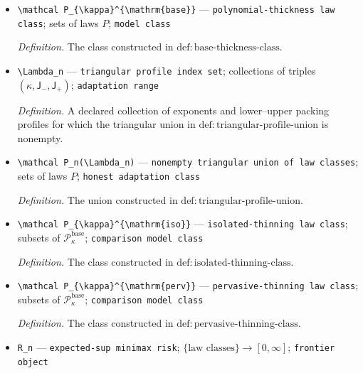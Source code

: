 \documentclass{article}
\begin{document}
\begin{itemize}
  \item \texttt{\textbackslash{}\allowbreak{}mathcal P\_\allowbreak{}\{\textbackslash{}\allowbreak{}kappa\}\allowbreak{}\textasciicircum{}\{\textbackslash{}\allowbreak{}mathrm\{base\}\allowbreak{}\}\allowbreak{}} --- \texttt{polynomial-\allowbreak{}thickness law class}; sets of laws \(P\); \texttt{model class}
  \par\smallskip\noindent\emph{Definition.} The class constructed in \(\mathrm{def:base\text{-}thickness\text{-}class}\).
  \item \texttt{\textbackslash{}\allowbreak{}Lambda\_\allowbreak{}n} --- \texttt{triangular profile index set}; collections of triples \( (\kappa,\mathsf J_{-},\mathsf J_{+})\); \texttt{adaptation range}
  \par\smallskip\noindent\emph{Definition.} A declared collection of exponents and lower--upper packing profiles for which the triangular union in \(\mathrm{def:triangular\text{-}profile\text{-}union}\) is nonempty.
  \item \texttt{\textbackslash{}\allowbreak{}mathcal P\_\allowbreak{}n(\textbackslash{}\allowbreak{}Lambda\_\allowbreak{}n)} --- \texttt{nonempty triangular union of law classes}; sets of laws \(P\); \texttt{honest adaptation class}
  \par\smallskip\noindent\emph{Definition.} The union constructed in \(\mathrm{def:triangular\text{-}profile\text{-}union}\).
  \item \texttt{\textbackslash{}\allowbreak{}mathcal P\_\allowbreak{}\{\textbackslash{}\allowbreak{}kappa\}\allowbreak{}\textasciicircum{}\{\textbackslash{}\allowbreak{}mathrm\{iso\}\allowbreak{}\}\allowbreak{}} --- \texttt{isolated-\allowbreak{}thinning law class}; subsets of \(\mathcal P_{\kappa}^{\mathrm{base}}\); \texttt{comparison model class}
  \par\smallskip\noindent\emph{Definition.} The class constructed in \(\mathrm{def:isolated\text{-}thinning\text{-}class}\).
  \item \texttt{\textbackslash{}\allowbreak{}mathcal P\_\allowbreak{}\{\textbackslash{}\allowbreak{}kappa\}\allowbreak{}\textasciicircum{}\{\textbackslash{}\allowbreak{}mathrm\{perv\}\allowbreak{}\}\allowbreak{}} --- \texttt{pervasive-\allowbreak{}thinning law class}; subsets of \(\mathcal P_{\kappa}^{\mathrm{base}}\); \texttt{comparison model class}
  \par\smallskip\noindent\emph{Definition.} The class constructed in \(\mathrm{def:pervasive\text{-}thinning\text{-}class}\).
  \item \texttt{R\_\allowbreak{}n} --- \texttt{expected-\allowbreak{}sup minimax risk}; \(\{\text{law classes}\}\to[0,\infty]\); \texttt{frontier object}

\end{itemize}
\end{document}
